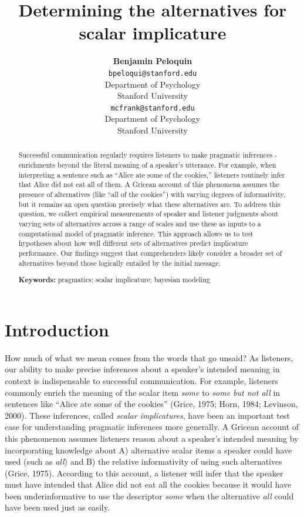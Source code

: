 \documentclass[10pt, letterpaper]{article}
\title{Determining the alternatives for scalar implicature}
\author{{\large \bf Benjamin Peloquin} \\ \texttt{bpeloqui@stanford.edu} \\ Department of Psychology \\ Stanford University \And {\large \bf Michael C. Frank} \\ \texttt{mcfrank@stanford.edu} \\ Department of Psychology \\ Stanford University}
\begin{document}
\maketitle

\begin{abstract}
Successful communication regularly requires listeners to make pragmatic
inferences - enrichments beyond the literal meaning of a speaker's
utterance. For example, when interpreting a sentence such as ``Alice ate
some of the cookies,'' listeners routinely infer that Alice did not eat
all of them. A Gricean account of this phenomena assumes the presence of
alternatives (like ``all of the cookies'') with varying degrees of
informativity, but it remains an open question precisely what these
alternatives are. To address this question, we collect empirical
measurements of speaker and listener judgments about varying sets of
alternatives across a range of scales and use these as inputs to a
computational model of pragmatic inference. This approach allows us to
test hypotheses about how well different sets of alternatives predict
implicature performance. Our findings suggest that comprehenders likely
consider a broader set of alternatives beyond those logically entailed
by the initial message.

\textbf{Keywords:}
pragmatics; scalar implicature; bayesian modeling
\end{abstract}

\section{Introduction}\label{introduction}

How much of what we mean comes from the words that go unsaid? As
listeners, our ability to make precise inferences about a speaker's
intended meaning in context is indispensable to successful
communication. For example, listeners commonly enrich the meaning of the
scalar item \emph{some} to \emph{some but not all} in sentences like
``Alice ate some of the cookies'' (Grice, 1975; Horn, 1984; Levinson,
2000). These inferences, called \emph{scalar implicatures}, have been an
important test case for understanding pragmatic inferences more
generally. A Gricean account of this phenomenon assumes listeners reason
about a speaker's intended meaning by incorporating knowledge about A)
alternative scalar items a speaker could have used (such as \emph{all})
and B) the relative informativity of using such alternatives (Grice,
1975). According to this account, a listener will infer that the speaker
must have intended that Alice did not eat all the cookies because it
would have been underinformative to use the descriptor \emph{some} when
the alternative \emph{all} could have been used just as easily.
\end{document}
